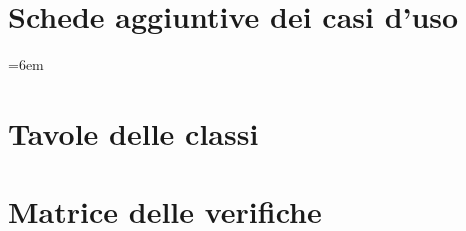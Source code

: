 \chapter{Schede aggiuntive dei casi d'uso}\label{app:casi-uso}
\begingroup
\emergencystretch=6em

\endgroup

\chapter{Tavole delle classi}\label{app:classi}


\chapter{Matrice delle verifiche}\label{app:verifiche}

